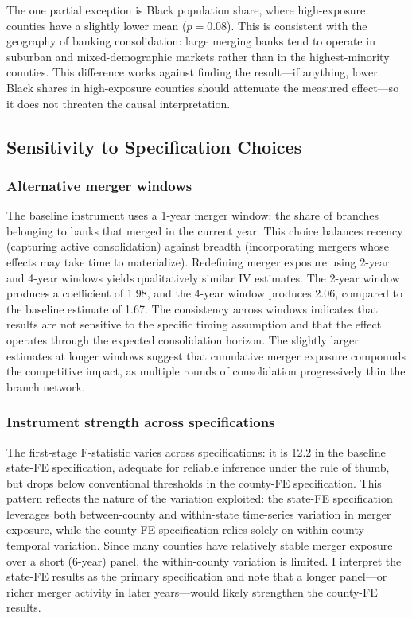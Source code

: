 \documentclass[12pt]{article}
\begin{document}
The one partial exception is Black population share, where high-exposure counties have a slightly lower mean ($p = 0.08$). This is consistent with the geography of banking consolidation: large merging banks tend to operate in suburban and mixed-demographic markets rather than in the highest-minority counties. This difference works against finding the result---if anything, lower Black shares in high-exposure counties should attenuate the measured effect---so it does not threaten the causal interpretation.

\subsection{Sensitivity to Specification Choices}

\subsubsection*{Alternative merger windows} The baseline instrument uses a 1-year merger window: the share of branches belonging to banks that merged in the current year. This choice balances recency (capturing active consolidation) against breadth (incorporating mergers whose effects may take time to materialize). Redefining merger exposure using 2-year and 4-year windows yields qualitatively similar IV estimates. The 2-year window produces a coefficient of 1.98, and the 4-year window produces 2.06, compared to the baseline estimate of 1.67. The consistency across windows indicates that results are not sensitive to the specific timing assumption and that the effect operates through the expected consolidation horizon. The slightly larger estimates at longer windows suggest that cumulative merger exposure compounds the competitive impact, as multiple rounds of consolidation progressively thin the branch network.

\subsubsection*{Instrument strength across specifications} The first-stage F-statistic varies across specifications: it is 12.2 in the baseline state-FE specification, adequate for reliable inference under the \citet{sunandabraham2021} rule of thumb, but drops below conventional thresholds in the county-FE specification. This pattern reflects the nature of the variation exploited: the state-FE specification leverages both between-county and within-state time-series variation in merger exposure, while the county-FE specification relies solely on within-county temporal variation. Since many counties have relatively stable merger exposure over a short (6-year) panel, the within-county variation is limited. I interpret the state-FE results as the primary specification and note that a longer panel---or richer merger activity in later years---would likely strengthen the county-FE results.
\end{document}
